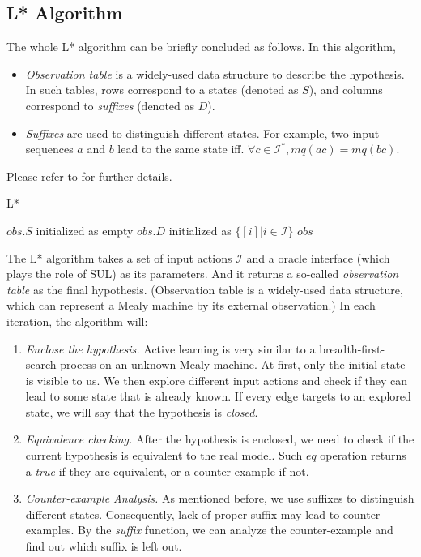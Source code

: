 \documentclass[conference, a4paper]{IEEEtran}
\begin{document}
\subsection{L* Algorithm}
The whole L* algorithm can be briefly concluded as follows. In this algorithm,
\begin{itemize}
  \item \emph{Observation table} is a widely-used data structure to describe the hypothesis. In such
    tables, rows correspond to a states (denoted as $S$), and columns correspond to \emph{suffixes}
    (denoted as $D$).
  \item \emph{Suffixes} are used to distinguish different states. For example, two input sequences
    $a$ and $b$ lead to the same state iff. $\forall c\in\mathcal{I}^*, mq(ac) = mq(bc)$.
\end{itemize}
Please refer to \cite{DBLP:conf/sfm/SteffenHM11, DBLP:journals/iandc/Angluin87} for further details.
\begin{algorithm} 
  \caption{L*} 
  \label{alg:lstar}
  $obs.S$ initialized as empty\;
  $obs.D$ initialized as $\{[i]|i\in\mathcal{I}\}$\;
  \Return $obs$\; 
\end{algorithm}

The L* algorithm takes a set of input actions $\mathcal{I}$ and a oracle interface (which plays the
role of SUL) as its parameters. And it returns a so-called \emph{observation table} as the final
hypothesis. (Observation table is a widely-used data structure, which can represent a Mealy machine
by its external observation.)
In each iteration, the algorithm will:
\begin{enumerate}
  \item \emph{Enclose the hypothesis.} Active learning is very similar to a breadth-first-search
    process on an unknown Mealy machine. At first, only the initial state is visible to us. We then
    explore different input actions and check if they can lead to some state that is already known.
    If every edge targets to an explored state, we will say that the hypothesis is \emph{closed}.
  \item \emph{Equivalence checking.} After the hypothesis is enclosed, we need to check if the
    current hypothesis is equivalent to the real model. Such $eq$ operation returns a
    \emph{true} if they are equivalent, or a counter-example if not.
  \item \emph{Counter-example Analysis.} As mentioned before, we use suffixes to distinguish
    different states. Consequently, lack of proper suffix may lead to counter-examples. By the
    \emph{suffix} function, we can analyze the counter-example and find out which suffix is left out.
\end{enumerate}
\end{document}
